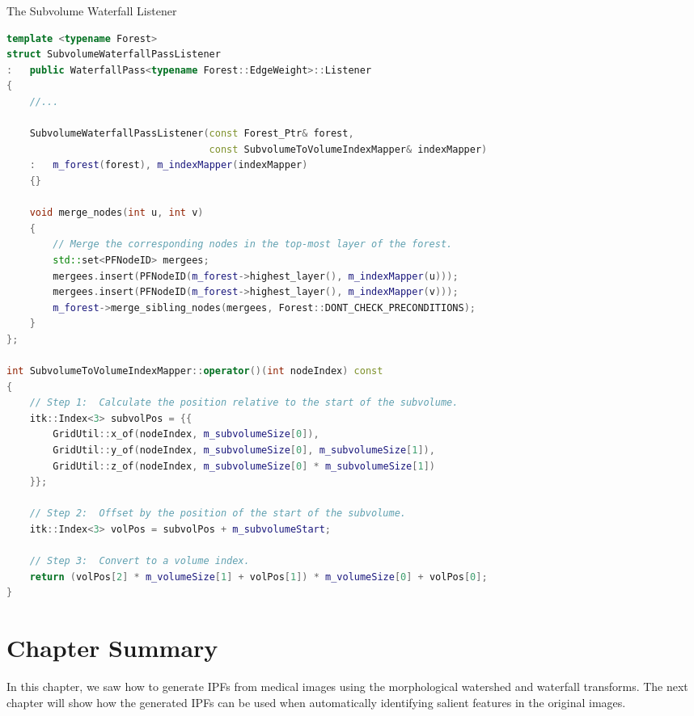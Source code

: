 \begin{stulisting}[p]
\caption{The Subvolume Waterfall Listener}
\label{code:segmentation-ipfconstruction-subvolume-waterfalllistener}
\begin{lstlisting}[style=Default,language=C++]
template <typename Forest>
struct SubvolumeWaterfallPassListener
:	public WaterfallPass<typename Forest::EdgeWeight>::Listener
{
	//...

	SubvolumeWaterfallPassListener(const Forest_Ptr& forest,
								   const SubvolumeToVolumeIndexMapper& indexMapper)
	:	m_forest(forest), m_indexMapper(indexMapper)
	{}

	void merge_nodes(int u, int v)
	{
		// Merge the corresponding nodes in the top-most layer of the forest.
		std::set<PFNodeID> mergees;
		mergees.insert(PFNodeID(m_forest->highest_layer(), m_indexMapper(u)));
		mergees.insert(PFNodeID(m_forest->highest_layer(), m_indexMapper(v)));
		m_forest->merge_sibling_nodes(mergees, Forest::DONT_CHECK_PRECONDITIONS);
	}
};

int SubvolumeToVolumeIndexMapper::operator()(int nodeIndex) const
{
	// Step 1:	Calculate the position relative to the start of the subvolume.
	itk::Index<3> subvolPos = {{
		GridUtil::x_of(nodeIndex, m_subvolumeSize[0]),
		GridUtil::y_of(nodeIndex, m_subvolumeSize[0], m_subvolumeSize[1]),
		GridUtil::z_of(nodeIndex, m_subvolumeSize[0] * m_subvolumeSize[1])
	}};

	// Step 2:	Offset by the position of the start of the subvolume.
	itk::Index<3> volPos = subvolPos + m_subvolumeStart;

	// Step 3:	Convert to a volume index.
	return (volPos[2] * m_volumeSize[1] + volPos[1]) * m_volumeSize[0] + volPos[0];
}
\end{lstlisting}
\end{stulisting}


\vspace{-.7\baselineskip}

\section{Chapter Summary}

\vspace{-.3\baselineskip}

In this chapter, we saw how to generate IPFs from medical images using the morphological watershed and waterfall transforms. The next chapter will show how the generated IPFs can be used when automatically identifying salient features in the original images.
